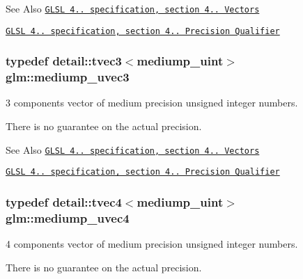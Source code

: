 \begin{DoxySeeAlso}{See Also}
\href{http://www.opengl.org/registry/doc/GLSLangSpec.4.20.8.pdf}{\tt G\-L\-S\-L 4.. specification, section 4.. Vectors} 

\href{http://www.opengl.org/registry/doc/GLSLangSpec.4.20.8.pdf}{\tt G\-L\-S\-L 4.. specification, section 4.. Precision Qualifier} 
\end{DoxySeeAlso}
\hypertarget{group__core__precision_gaa69cb8ff23d5c3daa3cf320136ac8e7d}{
\subsubsection[{mediump\-\_\-uvec3}]{\setlength{\rightskip}{0pt plus 5cm}typedef detail\-::tvec3$<$mediump\-\_\-uint$>$ {\bf glm\-::mediump\-\_\-uvec3}}}\label{group__core__precision_gaa69cb8ff23d5c3daa3cf320136ac8e7d}


3 components vector of medium precision unsigned integer numbers. 

There is no guarantee on the actual precision.

\begin{DoxySeeAlso}{See Also}
\href{http://www.opengl.org/registry/doc/GLSLangSpec.4.20.8.pdf}{\tt G\-L\-S\-L 4.. specification, section 4.. Vectors} 

\href{http://www.opengl.org/registry/doc/GLSLangSpec.4.20.8.pdf}{\tt G\-L\-S\-L 4.. specification, section 4.. Precision Qualifier} 
\end{DoxySeeAlso}
\hypertarget{group__core__precision_ga50b1bc4e07de623f15ec5a319c85609f}{
\subsubsection[{mediump\-\_\-uvec4}]{\setlength{\rightskip}{0pt plus 5cm}typedef detail\-::tvec4$<$mediump\-\_\-uint$>$ {\bf glm\-::mediump\-\_\-uvec4}}}\label{group__core__precision_ga50b1bc4e07de623f15ec5a319c85609f}


4 components vector of medium precision unsigned integer numbers. 

There is no guarantee on the actual precision.


